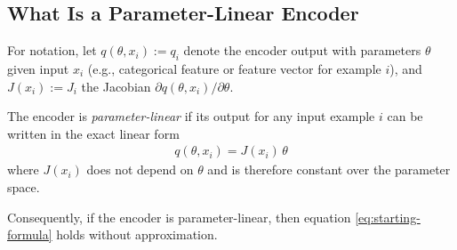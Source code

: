 \subsection{What Is a Parameter-Linear Encoder}

For notation, let
\( q(\theta, x_i) := q_i \) 
denote the encoder output with parameters $\theta$ given input $x_i$ (e.g., categorical feature or feature vector for example $i$), and
\( J(x_i) := J_i \) 
the Jacobian $\partial q(\theta, x_i)/\partial\theta$.

The encoder is \emph{parameter-linear} if its output for any input example $i$ can be written in the exact linear form
\begin{align}
q(\theta, x_i) = J(x_i)\,\theta
\end{align}
where $J(x_i)$ does not depend on $\theta$ and is therefore constant over the parameter space.

Consequently, if the encoder is parameter-linear, then equation \eqref{eq:starting-formula} holds without approximation.